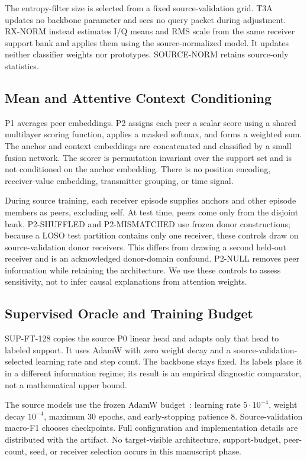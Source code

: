 The entropy-filter size is selected from a fixed source-validation grid. T3A updates no backbone parameter and sees no query packet during adjustment. RX-NORM instead estimates I/Q means and RMS scale from the same receiver support bank and applies them using the source-normalized model. It updates neither classifier weights nor prototypes. SOURCE-NORM retains source-only statistics.

\subsection{Mean and Attentive Context Conditioning}
P1 averages peer embeddings. P2 assigns each peer a scalar score using a shared multilayer scoring function, applies a masked softmax, and forms a weighted sum. The anchor and context embeddings are concatenated and classified by a small fusion network. The scorer is permutation invariant over the support set and is not conditioned on the anchor embedding. There is no position encoding, receiver-value embedding, transmitter grouping, or time signal.

During source training, each receiver episode supplies anchors and other episode members as peers, excluding self. At test time, peers come only from the disjoint bank. P2-SHUFFLED and P2-MISMATCHED use frozen donor constructions; because a LOSO test partition contains only one receiver, these controls draw on source-validation donor receivers. This differs from drawing a second held-out receiver and is an acknowledged donor-domain confound. P2-NULL removes peer information while retaining the architecture. We use these controls to assess sensitivity, not to infer causal explanations from attention weights.

\subsection{Supervised Oracle and Training Budget}
SUP-FT-128 copies the source P0 linear head and adapts only that head to labeled support. It uses AdamW with zero weight decay and a source-validation-selected learning rate and step count. The backbone stays fixed. Its labels place it in a different information regime; its result is an empirical diagnostic comparator, not a mathematical upper bound.

The source models use the frozen AdamW budget~\cite{adamw}: learning rate $5\cdot10^{-4}$, weight decay $10^{-4}$, maximum 30 epochs, and early-stopping patience 8. Source-validation macro-F1 chooses checkpoints. Full configuration and implementation details are distributed with the artifact. No target-visible architecture, support-budget, peer-count, seed, or receiver selection occurs in this manuscript phase.

